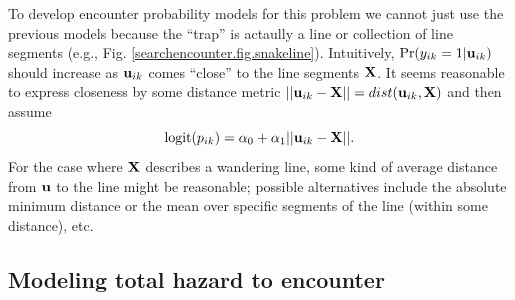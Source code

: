 To develop encounter probability models for this problem we cannot
just use the previous models because the ``trap'' is actaully a line
or collection of line segments (e.g.,
Fig. \ref{searchencounter.fig.snakeline}).  Intuitively,
$\Pr(y_{ik}=1|{\bf u}_{ik})$ should increase as ${\bf u}_{ik}$ comes
``close'' to the line segments ${\bf X}$. It seems reasonable to
express closeness by some distance metric $|| {\bf u}_{ik} - {\bf X}
|| = dist( {\bf u}_{ik}, {\bf X})$ and then assume
\[
\mbox{logit}(p_{ik}) = \alpha_{0} + \alpha_{1} || {\bf u}_{ik} - {\bf X} ||.
\]
For the case where ${\bf X}$ describes a wandering line, some
kind of average distance from ${\bf u}$ to the line
might be reasonable; possible alternatives include the absolute
minimum distance or the mean over specific segments
of the line (within some distance), etc.

\subsection{Modeling total hazard to encounter}

